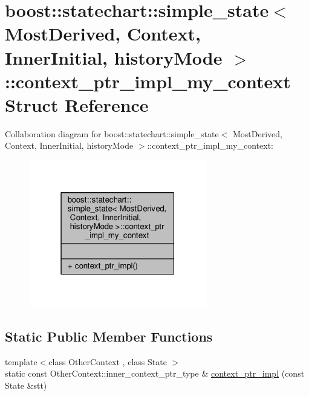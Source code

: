 \hypertarget{structboost_1_1statechart_1_1simple__state_1_1context__ptr__impl__my__context}{}\section{boost\+:\+:statechart\+:\+:simple\+\_\+state$<$ Most\+Derived, Context, Inner\+Initial, history\+Mode $>$\+:\+:context\+\_\+ptr\+\_\+impl\+\_\+my\+\_\+context Struct Reference}
\label{structboost_1_1statechart_1_1simple__state_1_1context__ptr__impl__my__context}


Collaboration diagram for boost\+:\+:statechart\+:\+:simple\+\_\+state$<$ Most\+Derived, Context, Inner\+Initial, history\+Mode $>$\+:\+:context\+\_\+ptr\+\_\+impl\+\_\+my\+\_\+context\+:
\nopagebreak
\begin{figure}[H]
\begin{center}
\leavevmode
\includegraphics[width=220pt]{structboost_1_1statechart_1_1simple__state_1_1context__ptr__impl__my__context__coll__graph}
\end{center}
\end{figure}
\subsection*{Static Public Member Functions}
\begin{DoxyCompactItemize}
\item 
{\footnotesize template$<$class Other\+Context , class State $>$ }\\static const Other\+Context\+::inner\+\_\+context\+\_\+ptr\+\_\+type \& \mbox{\hyperlink{structboost_1_1statechart_1_1simple__state_1_1context__ptr__impl__my__context_aaa2140e2cefe3d97066e8cf11d321090}{context\+\_\+ptr\+\_\+impl}} (const State \&stt)
\end{DoxyCompactItemize}


